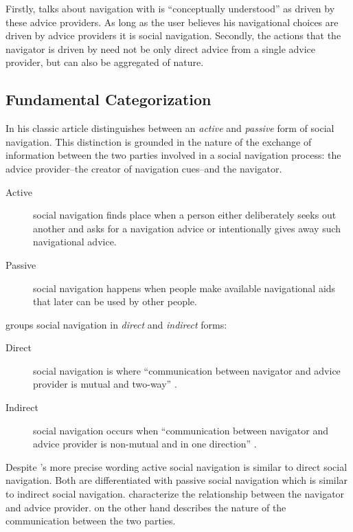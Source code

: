 Firstly, \citeauthor{svensson03} talks about navigation with is ``conceptually
understood'' as driven by these advice providers. As long as the user believes
his navigational choices are driven by advice providers it is social
navigation. Secondly, the actions that the navigator is driven by need not be
only direct advice from a single advice provider, but can also be aggregated
of nature.

\subsection{Fundamental Categorization}
In his classic article \citet{dieberger97} distinguishes between an
\emph{active} and \emph{passive} form of social navigation. This distinction
is grounded in the nature of the exchange of information between the two
parties involved in a social navigation process: the advice
provider--the creator of navigation cues--and the navigator.

\begin{description}
  \item[Active] social navigation finds place when a person either
    deliberately seeks out another and asks for a navigation advice or
    intentionally gives away such navigational advice.
  \item[Passive] social navigation happens when people make available
    navigational aids that later can be used by other people.
\end{description}

\citeauthor{svensson03} groups social navigation in \emph{direct}
and \emph{indirect} forms:

\begin{description}
  \item[Direct] social navigation is where ``communication between navigator
    and advice provider is mutual and two-way''
    \citep[p.~21]{svensson03}.
  \item[Indirect] social navigation occurs when ``communication between
    navigator and advice provider is non-mutual and in one direction''
    \citep[p.~21]{svensson03}.
\end{description}

Despite \citeauthor{svensson03}'s more precise wording active social
navigation is similar to direct social navigation. Both are differentiated
with passive social navigation which is similar to indirect social navigation.
\citeauthor{dieberger97} characterize the relationship between the
navigator and advice provider. \citeauthor{svensson03} on the other hand
describes the nature of the communication between the two parties.

